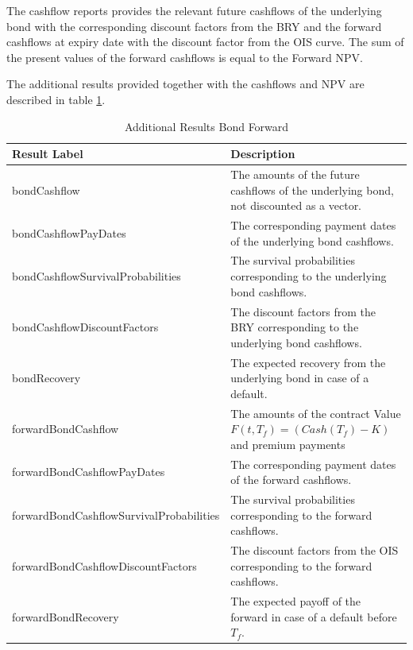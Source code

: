 The cashflow reports provides the relevant future cashflows of the underlying bond with the corresponding discount factors from the BRY and
the forward cashflows at expiry date with the discount factor from the OIS curve.
The sum of the present values of the forward cashflows is equal to the Forward NPV.

The additional results provided together with the cashflows and NPV are described in table
\ref{tab:additional_results_bond_forward}.

\begin{table}[H]
\begin{center}
\begin{tabular}{|p{8cm}|p{7cm}|}
  \hline
  Result Label & Description \\
  \hline
  bondCashflow & The amounts of the future cashflows of the underlying bond, not discounted as a vector.\\
  \hline
  bondCashflowPayDates & The corresponding payment dates of the underlying bond cashflows. \\
  \hline
  bondCashflowSurvivalProbabilities & The survival probabilities corresponding to the underlying bond cashflows. \\
  \hline
  bondCashflowDiscountFactors & The discount factors from the BRY corresponding to the underlying bond cashflows. \\
  \hline
  bondRecovery & The expected recovery from the underlying bond in case of a default. \\
  \hline
  forwardBondCashflow & The amounts of the contract Value $F(t,T_f)=\left(Cash(T_f)-K\right)$ and premium payments\\
  \hline
  forwardBondCashflowPayDates & The corresponding payment dates of the forward cashflows. \\
  \hline
  forwardBondCashflowSurvivalProbabilities & The survival probabilities corresponding to the forward cashflows. \\
  \hline
  forwardBondCashflowDiscountFactors & The discount factors from the OIS corresponding to the forward cashflows. \\
  \hline
  forwardBondRecovery & The expected payoff of the forward in case of a default before $T_f$. \\
  \hline
\end{tabular}
\end{center}
\caption{Additional Results Bond Forward}
\label{tab:additional_results_bond_forward}
\end{table}
